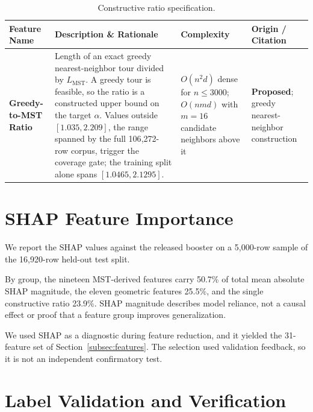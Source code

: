 \documentclass{article}
\begin{document}
\begin{table}[!htbp]
\centering
\caption{Constructive ratio specification.}
\label{tab:greedy_features}
\setlength{\tabcolsep}{4pt}
\begin{tabular}{@{}
  >{\footnotesize\raggedright\arraybackslash}p{}
  >{\footnotesize\raggedright\arraybackslash}p{}
  >{\footnotesize\raggedright\arraybackslash}p{}
  >{\footnotesize\raggedright\arraybackslash}p{}@{}}
\toprule
\textbf{Feature Name} & \textbf{Description \& Rationale} & \textbf{Complexity} & \textbf{Origin / Citation} \\ \midrule
\textbf{Greedy-to-MST Ratio} & Length of an exact greedy nearest-neighbor tour divided by $L_{\mathrm{MST}}$. A greedy tour is feasible, so the ratio is a constructed upper bound on the target $\alpha$. Values outside $[1.035,2.209]$, the range spanned by the full 106{,}272-row corpus, trigger the coverage gate; the training split alone spans $[1.0465,2.1295]$. & $O(n^2 d)$ dense for $n\le3000$; $O(nmd)$ with $m=16$ candidate neighbors above it & \textbf{Proposed}; greedy nearest-neighbor construction \\ \bottomrule
\end{tabular}
\end{table}

\section{SHAP Feature Importance} \label{app:shap}

We report the SHAP values \citep{lundberg2017shap} against the released booster on a 5{,}000-row sample of the 16{,}920-row held-out test split.

By group, the nineteen MST-derived features carry 50.7\% of total mean absolute SHAP magnitude, the eleven geometric features 25.5\%, and the single constructive ratio 23.9\%. SHAP magnitude describes model reliance, not a causal effect or proof that a feature group improves generalization.

We used SHAP as a diagnostic during feature reduction, and it yielded the 31-feature set of Section~\ref{subsec:features}. The selection used validation feedback, so it is not an independent confirmatory test.

\section{Label Validation and Verification} \label{app:labels}
\end{document}
